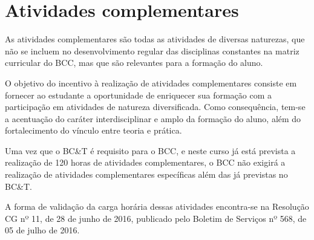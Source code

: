 \section{Atividades complementares}

As atividades complementares são todas as atividades de diversas naturezas, que
não se incluem no desenvolvimento regular das disciplinas constantes na matriz
curricular do BCC, mas que são relevantes para a formação do aluno.

O objetivo do incentivo à realização de atividades complementares consiste em
fornecer ao estudante a oportunidade de enriquecer sua formação com a
participação em atividades de natureza diversificada. 
Como consequência, tem-se a acentuação do caráter interdisciplinar e amplo da
formação do aluno, além do fortalecimento do vínculo entre teoria e prática.

Uma vez que o BC\&T é requisito para o BCC, e neste curso já está prevista a
realização de 120 horas de atividades complementares, o BCC não exigirá a
realização de atividades complementares específicas além das já previstas no
BC\&T. 

A forma de validação da carga horária dessas atividades encontra-se na
Resolução CG nº 11, de 28 de junho de 2016, publicado pelo Boletim de Serviços
nº 568, de 05 de julho de 2016.
